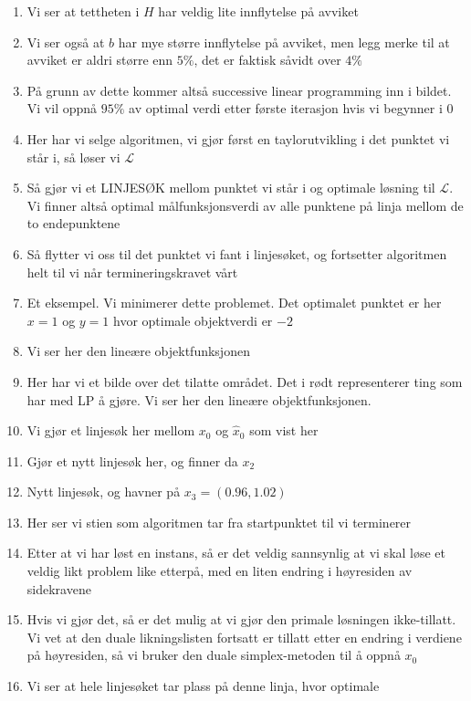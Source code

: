 \documentclass[a4paper,twocolumn]{report}
\begin{document}
\begin{enumerate}
\item Vi ser at tettheten i $H$ har veldig lite innflytelse på avviket
\item Vi ser også at $b$ har mye større innflytelse på avviket, men legg
      merke til at avviket er aldri større enn $5\%$, det er faktisk såvidt
      over $4\%$
\item På grunn av dette kommer altså successive linear programming inn i
      bildet. Vi vil oppnå $95\%$ av optimal verdi etter første iterasjon
      hvis vi begynner i $0$
\item Her har vi selge algoritmen, vi gjør først en taylorutvikling i det
      punktet vi står i, så løser vi $\mathcal{L}$
\item Så gjør vi et LINJESØK mellom punktet vi står i og optimale løsning til
      $\mathcal{L}$. Vi finner altså optimal målfunksjonsverdi av alle punktene
      på linja mellom de to endepunktene
\item Så flytter vi oss til det punktet vi fant i linjesøket, og fortsetter
      algoritmen helt til vi når termineringskravet vårt
\item Et eksempel. Vi minimerer dette problemet. Det optimalet punktet er her
      $x = 1$ og $y = 1$ hvor optimale objektverdi er $-2$
\item Vi ser her den lineære objektfunksjonen
\item Her har vi et bilde over det tilatte området. Det i rødt representerer
      ting som har med LP å gjøre. Vi ser her den lineære objektfunksjonen.
\item Vi gjør et linjesøk her mellom $x_0$ og $\hat{x}_0$ som vist her
\item Gjør et nytt linjesøk her, og finner da $x_2$
\item Nytt linjesøk, og havner på $x_3 = (0.96,1.02)$
\item Her ser vi stien som algoritmen tar fra startpunktet til vi terminerer
\item Etter at vi har løst en instans, så er det veldig sannsynlig at vi skal
      løse et veldig likt problem like etterpå, med en liten endring i
      høyresiden av sidekravene
\item Hvis vi gjør det, så er det mulig at vi gjør den primale løsningen
      ikke-tillatt. Vi vet at den duale likningslisten fortsatt er tillatt
      etter en endring i verdiene på høyresiden, så vi bruker den duale
      simplex-metoden til å oppnå $x_0$
\item Vi ser at hele linjesøket tar plass på denne linja, hvor optimale

\end{enumerate}
\end{document}
